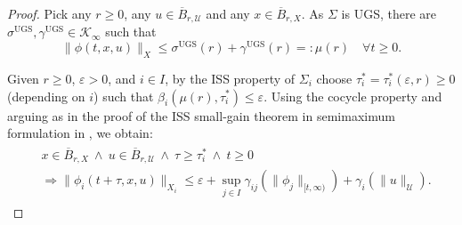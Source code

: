 \documentclass[twocolumn]{IEEEtran} %
\theoremstyle{definition}
\newcommand{\Uc}{\mathcal{U}}%
\newcommand{\Kinf}{\mathcal{K_\infty}}%
\newcommand{\ep}{\varepsilon}%
\newcommand{\UGS}{\mathrm{UGS}}%
\newcommand \qrq   {\quad\Rightarrow\quad}
\begin{document}
\begin{proof}
Pick any $r \geq 0$, any $u \in \overline{B}_{r,\Uc}$ and any $x \in \overline{B}_{r,X}$. As $\Sigma$ is UGS, there are $\sigma^{\UGS},\gamma^{\UGS} \in \Kinf$ 
such that%
\begin{equation}
\label{eq:mu-definition}
  \|\phi(t,x,u)\|_X \leq \sigma^{\UGS}(r) + \gamma^{\UGS}(r) =: \mu(r) \quad \forall t \geq 0.
\end{equation}

Given $r\geq 0$, $\ep>0$, and $i\in I$, by the ISS property of $\Sigma_i$  choose $\tau^*_i = \tau^*_i(\ep,r) \geq 0$ (depending on $i$)  
such that $\beta_{i}(\mu(r),\tau^*_i) \leq \ep$. Using the cocycle property and arguing as in the proof of the ISS small-gain theorem in semimaximum formulation in \cite[Theorem 2]{MKG20}, we obtain:
\begin{align}\label{eq_firstest-NU-ISS-SGT-1}
\begin{split}
 &x \in \overline{B}_{r,X} \ \wedge \  u \in \overline{B}_{r,\Uc} \ \wedge \ \tau \geq \tau^*_i \ \wedge \ t \geq 0 \\
	&\Rightarrow \|\phi_i(t+\tau,x,u)\|_{X_i} 
																	\leq \ep {+} \sup_{j \in I}\gamma_{ij}(\|\phi_j\|_{[t,\infty)}) {+} \gamma_i(\|u\|_{\Uc}).%
\end{split}
\end{align}


%


\end{proof}
\end{document}
